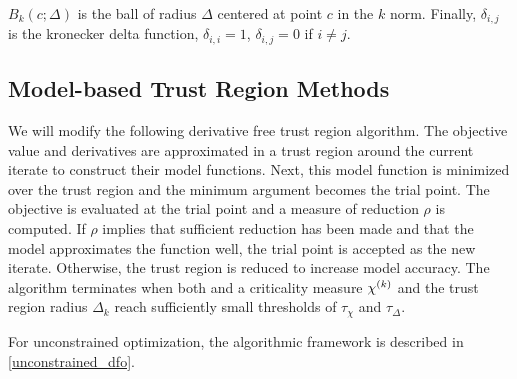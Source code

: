 $B_k(c; \Delta)$ is the ball of radius $\Delta$ centered at point $c$ in the $k$ norm.
Finally, $\delta_{i,j}$ is the kronecker delta function, $\delta_{i,i} = 1$, $\delta_{i,j} = 0$ if $i\ne j$.


\subsection{Model-based Trust Region Methods}

We will modify the following derivative free trust region algorithm.
The objective value and derivatives are approximated in a trust region around the current iterate to construct their model functions.
Next, this model function is minimized over the trust region and the minimum argument becomes the trial point.
The objective is evaluated at the trial point and a measure of reduction $\rho$ is computed.
If $\rho$ implies that sufficient reduction has been made and that the model approximates the function well, the trial point is accepted as the new iterate.
Otherwise, the trust region is reduced to increase model accuracy.
The algorithm terminates when both and a criticality measure ${\chi^{(k)}}$ and the trust region radius $\Delta_k$ reach sufficiently small thresholds of $\tau_{\chi}$ and $\tau_{\Delta}$.


For unconstrained optimization, the algorithmic framework is described in \cref{unconstrained_dfo}.

